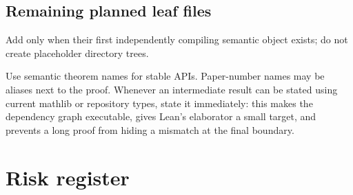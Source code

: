 \documentclass[11pt]{article}
\begin{document}
\subsection{Remaining planned leaf files}

\begin{description}[style=nextline,leftmargin=0pt]
  \item[\path{FiniteReductive/...}, \path{TypeD/...}, \path{CFSG/...}]
  Add only when their first independently compiling semantic object exists;
  do not create placeholder directory trees.
\end{description}

Use semantic theorem names for stable APIs.  Paper-number names may be
aliases next to the proof.  Whenever an intermediate result can be stated
using current mathlib or repository types, state it immediately: this makes
the dependency graph executable, gives Lean's elaborator a small target,
and prevents a long proof from hiding a mismatch at the final boundary.

\section{Risk register}
\end{document}
